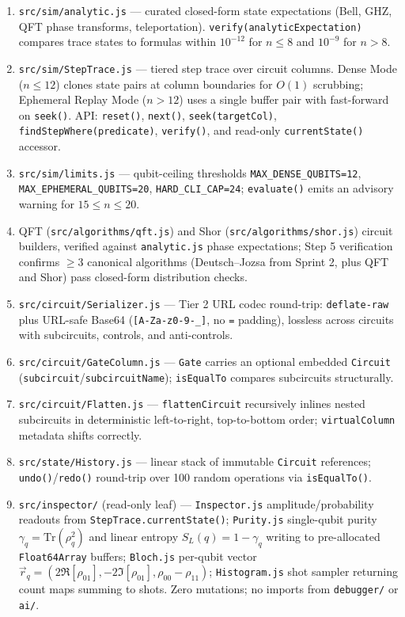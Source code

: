 \documentclass[conference]{IEEEtran}
\begin{document}
\begin{enumerate}
    \item \texttt{src/sim/analytic.js} --- curated closed-form state expectations (Bell, GHZ, QFT phase transforms, teleportation). \texttt{verify(analyticExpectation)} compares trace states to formulas within $10^{-12}$ for $n\le8$ and $10^{-9}$ for $n>8$.
    \item \texttt{src/sim/StepTrace.js} --- tiered step trace over circuit columns. Dense Mode ($n\le12$) clones state pairs at column boundaries for $O(1)$ scrubbing; Ephemeral Replay Mode ($n>12$) uses a single buffer pair with fast-forward on \texttt{seek()}. API: \texttt{reset()}, \texttt{next()}, \texttt{seek(targetCol)}, \texttt{findStepWhere(predicate)}, \texttt{verify()}, and read-only \texttt{currentState()} accessor.
    \item \texttt{src/sim/limits.js} --- qubit-ceiling thresholds \texttt{MAX\_DENSE\_QUBITS=12}, \texttt{MAX\_EPHEMERAL\_QUBITS=20}, \texttt{HARD\_CLI\_CAP=24}; \texttt{evaluate()} emits an advisory warning for $15\le n\le20$.
    \item QFT (\texttt{src/algorithms/qft.js}) and Shor (\texttt{src/algorithms/shor.js}) circuit builders, verified against \texttt{analytic.js} phase expectations; Step 5 verification confirms $\ge3$ canonical algorithms (Deutsch--Jozsa from Sprint 2, plus QFT and Shor) pass closed-form distribution checks.
    \item \texttt{src/circuit/Serializer.js} --- Tier 2 URL codec round-trip: \texttt{deflate-raw} plus URL-safe Base64 (\texttt{[A-Za-z0-9-\_]}, no \texttt{=} padding), lossless across circuits with subcircuits, controls, and anti-controls.
    \item \texttt{src/circuit/GateColumn.js} --- \texttt{Gate} carries an optional embedded \texttt{Circuit} (\texttt{subcircuit}/\texttt{subcircuitName}); \texttt{isEqualTo} compares subcircuits structurally.
    \item \texttt{src/circuit/Flatten.js} --- \texttt{flattenCircuit} recursively inlines nested subcircuits in deterministic left-to-right, top-to-bottom order; \texttt{virtualColumn} metadata shifts correctly.
    \item \texttt{src/state/History.js} --- linear stack of immutable \texttt{Circuit} references; \texttt{undo()}/\texttt{redo()} round-trip over 100 random operations via \texttt{isEqualTo()}.
    \item \texttt{src/inspector/} (read-only leaf) --- \texttt{Inspector.js} amplitude/probability readouts from \texttt{StepTrace.currentState()}; \texttt{Purity.js} single-qubit purity $\gamma_q=\mathrm{Tr}(\rho_q^2)$ and linear entropy $S_L(q)=1-\gamma_q$ writing to pre-allocated \texttt{Float64Array} buffers; \texttt{Bloch.js} per-qubit vector $\vec r_q=(2\Re[\rho_{01}],-2\Im[\rho_{01}],\rho_{00}-\rho_{11})$; \texttt{Histogram.js} shot sampler returning count maps summing to shots. Zero mutations; no imports from \texttt{debugger/} or \texttt{ai/}.

\end{enumerate}
\end{document}
